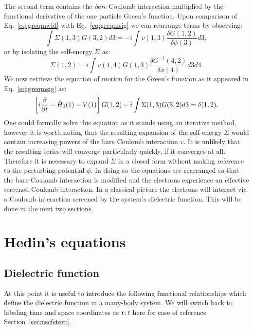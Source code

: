 The second term contains the \emph{bare} Coulomb interaction 
multiplied by the functional derivative of the 
one particle Green's function. Upon comparison of 
Eq.~\ref{eq:greqmwfd} with Eq.~\ref{eq:greqmsig} we can 
rearrange terms by observing:
%
\begin{equation}
\int \Sigma(1,3)G(3,2)d3 = -i\int v(1,3) \frac{\delta G(1,2)}{\delta \phi(3)}d3,
\end{equation}
%
or by isolating the self-energy $\Sigma$ as: %
%
\begin{equation}
\label{eq:sigma}
\Sigma(1,2) = i \int v(1,4) G(1,3) \frac{\delta G^{-1}(4,2)}{\delta\phi(4)}d3d4.
\end{equation}
%
We now retrieve the equation of motion for the Green's function 
as it appeared in Eq.~\ref{eq:greqmsig} as:
%
\begin{equation}
\label{eq:greqmsig2}
\left[i\frac{\partial}{\partial t} - \hat{H}_{0}(1) - V(1)\right]G(1,2) - i\int \Sigma(1,3)G(3,2)d3 = \delta(1,2).
\end{equation}
%
One could formally solve this equation as it stands using an iterative method, 
however it is worth noting that the resulting expansion of the self-energy $\Sigma$ 
would contain increasing powers of the bare Coulomb interaction $v$. 
It is unlikely that the resulting series will converge particularly 
quickly, if it converges at all. 
%
Therefore it is necessary to expand $\Sigma$ in a closed form without making 
reference to the perturbing potential $\phi$. In doing so the equations are rearranged so that
the bare Coulomb interaction is modified and the electrons experience 
an effective screened Coulomb interaction. In a classical picture the electrons will interact
via a Coulomb interaction screened by the system's dielectric function. 
This will be done in the next two sections.
%
\section{Hedin's equations}
\subsection{Dielectric function}
\label{sec:dielecfun}
\noindent
At this point it is useful to introduce the following functional relationships 
which define the dielectric function in a many-body system.
We will switch back to labeling time and space coordinates as ${\bf r},t$ 
here for ease of reference Section~\ref{sec:nscfstern}. 

